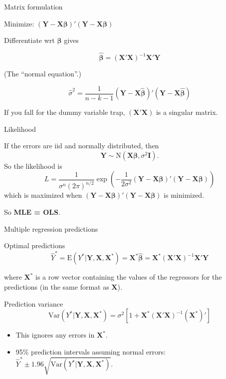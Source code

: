 \documentclass[14pt]{beamer}
\makeatletter
\def\biz{\begin{itemize}[<+-| alert@+>]}
\def\eiz{\end{itemize}}
\makeatother
\begin{document}
\begin{frame}{Matrix formulation}


Minimize: $(\bm{Y} - \bm{X}\bm{\beta})'(\bm{Y} - \bm{X}\bm{\beta})$\pause
\vspace*{0.5cm}

Differentiate wrt $\bm{\beta}$ gives

\begin{block}{}\vspace*{-0.2cm}
\[
\hat{\bm{\beta}} = (\bm{X}'\bm{X})^{-1}\bm{X}'\bm{Y}
\]
\end{block}
\pause
(The ``normal equation''.)\pause

\[
\hat{\sigma}^2 = \frac{1}{n-k-1}(\bm{Y} - \bm{X}\hat{\bm{\beta}})'(\bm{Y} - \bm{X}\hat{\bm{\beta}})
\]
\vspace*{.2cm}

 If you fall for the dummy variable trap, $(\bm{X}'\bm{X})$ is a singular matrix.
\end{frame}


\begin{frame}{Likelihood}

If the errors are iid and normally distributed, then
\[
\bm{Y} \sim \text{N}(\bm{X}\bm{\beta},\sigma^2\bm{I}).
\]\pause
So the likelihood is
\[
L = \frac{1}{\sigma^n(2\pi)^{n/2}}\exp\left(-\frac1{2\sigma^2}(\bm{Y}-\bm{X}\bm{\beta})'(\bm{Y}-\bm{X}\bm{\beta})\right)
\]\pause
which is maximized when $(\bm{Y}-\bm{X}\bm{\beta})'(\bm{Y}-\bm{X}\bm{\beta})$ is minimized.\pause

\centerline{\textcolor[rgb]{0.80,0.00,0.00}{So \textbf{MLE = OLS}.}}
\end{frame}


\begin{frame}{Multiple regression predictions}

\begin{block}{Optimal predictions}\vspace*{-0.2cm}
\[
\hat{Y}^* =
\text{E}(Y^* | \bm{Y},\bm{X},\bm{X}^*) =
\bm{X}^*\hat{\bm{\beta}} = \bm{X}^*(\bm{X}'\bm{X})^{-1}\bm{X}'\bm{Y}
\]
\end{block}
where $\bm{X}^*$ is a row vector containing the values of the regressors for the predictions (in the same format as $\bm{X}$).\vspace*{0.cm}

\pause

\begin{block}{Prediction variance}\vspace*{-0.2cm}
\[
\text{Var}(Y^* | \bm{Y},\bm{X},\bm{X}^*) = \sigma^2 \left[1 + \bm{X}^* (\bm{X}'\bm{X})^{-1} (\bm{X}^*)'\right]
\]
\end{block}\pause

\biz
\item This ignores any errors in $\bm{X}^*$.

\item 95\% prediction intervals assuming normal errors:
$  \hat{Y}^* \pm 1.96 \sqrt{\text{Var}(Y^*| \bm{Y},\bm{X},\bm{X}^*)}
$.
\eiz

\end{frame}
\end{document}
